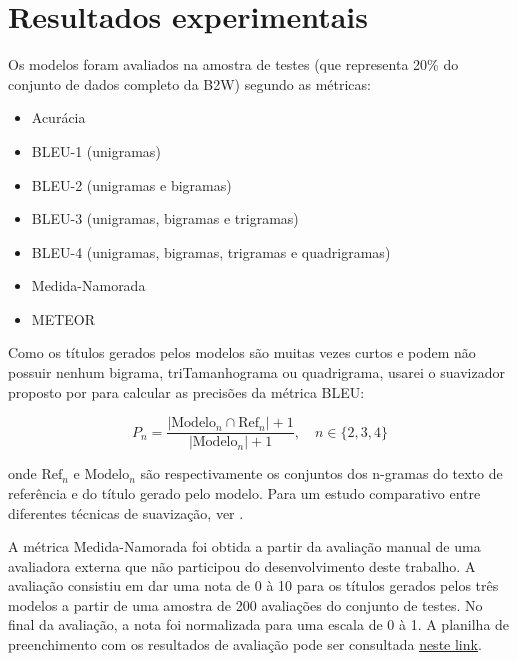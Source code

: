 \documentclass{article}
\begin{document}



\section{Resultados experimentais}

Os modelos foram avaliados na amostra de testes (que representa 20\% do conjunto de dados completo da B2W) segundo as métricas:

\begin{itemize}
	\item Acurácia
	\item BLEU-1 (unigramas)
	\item BLEU-2 (unigramas e bigramas)
	\item BLEU-3 (unigramas, bigramas e trigramas)
	\item BLEU-4 (unigramas, bigramas, trigramas e quadrigramas)
	\item Medida-Namorada
	\item METEOR
\end{itemize}

Como os títulos gerados pelos modelos são muitas vezes curtos e podem não possuir nenhum bigrama, triTamanhograma ou quadrigrama, usarei o suavizador proposto por \textcite{lin2004automatic} para calcular as precisões da métrica BLEU:

\begin{equation}
P_n = \frac{|\text{Modelo}_n \cap \text{Ref}_n| + 1}{|\text{Modelo}_n| + 1}, \quad n \in \{2, 3, 4\}
\end{equation}

\noindent onde $\text{Ref}_n$ e $\text{Modelo}_n$ são respectivamente os conjuntos dos n-gramas do texto de referência e do título gerado pelo modelo. Para um estudo comparativo entre diferentes técnicas de suavização, ver \textcite{chen2014systematic}.

A métrica Medida-Namorada foi obtida a partir da avaliação manual de uma avaliadora externa que não participou do desenvolvimento deste trabalho. A avaliação consistiu em dar uma nota de 0 à 10 para os títulos gerados pelos três modelos a partir de uma amostra de 200 avaliações do conjunto de testes. No final da avaliação, a nota foi normalizada para uma escala de 0 à 1. A planilha de preenchimento com os resultados de avaliação pode ser consultada  \href{https://docs.google.com/spreadsheets/d/1v9te15-LVNhdp3a1Iksk0YgP8a0gX4CPlsu6Jc0_5cI/edit?usp=sharing)}{neste link}.
\end{document}
